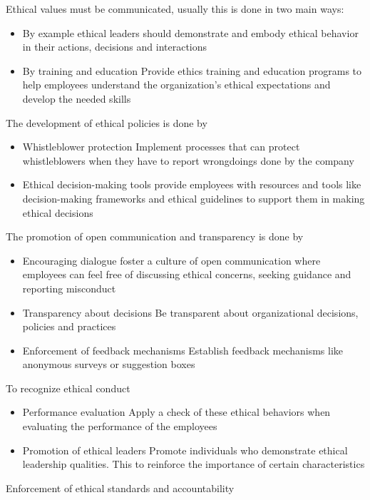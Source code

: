 Ethical values must be communicated, usually this is done in two main ways: 
\begin{itemize}
    \item By example \ra ethical leaders should demonstrate and embody ethical behavior in their actions, decisions and interactions
    \item By training and education \ra Provide ethics training and education programs to help employees understand the organization's ethical expectations and develop the needed skills
\end{itemize}

The development of ethical policies is done by
\begin{itemize}
    \item Whistleblower protection \ra Implement processes that can protect whistleblowers when they have to report wrongdoings done by the company
    \item Ethical decision-making tools \ra provide employees with resources and tools like decision-making frameworks and ethical guidelines to support them in making ethical decisions
\end{itemize}

The promotion of open communication and transparency is done by
\begin{itemize}
    \item Encouraging dialogue \ra foster a culture of open communication where employees can feel free of discussing ethical concerns, seeking guidance and reporting misconduct
    \item Transparency about decisions \ra Be transparent about organizational decisions, policies and practices
    \item Enforcement of feedback mechanisms \ra Establish feedback mechanisms like anonymous surveys or suggestion boxes
\end{itemize}

To recognize ethical conduct
\begin{itemize}
    \item Performance evaluation \ra Apply a check of these ethical behaviors when evaluating the performance of the employees
    \item Promotion of ethical leaders \ra Promote individuals who demonstrate ethical leadership qualities. This to reinforce the importance of certain characteristics
\end{itemize}

Enforcement of ethical standards and accountability

